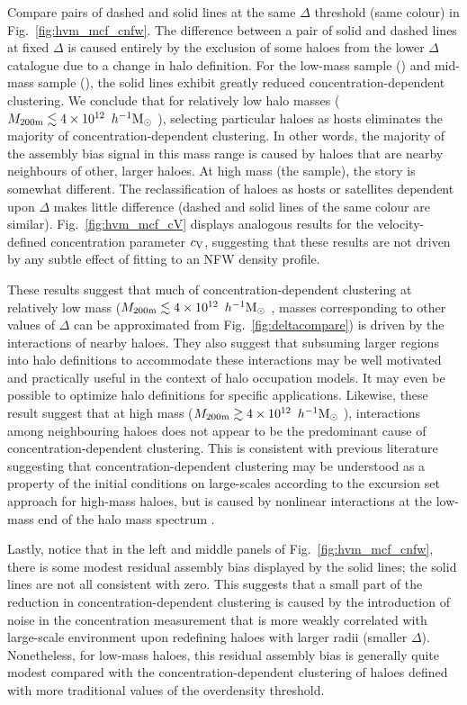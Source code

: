 \documentclass[usenatbib,fleqn]{mnras}
\begin{document}
Compare pairs of dashed and solid lines at the same $\Delta$ threshold (same colour) in Fig.~\ref{fig:hvm_mcf_cnfw}. The difference between a pair of solid and dashed lines at fixed $\Delta$ is caused entirely by the exclusion of some haloes from the lower $\Delta$ catalogue due to a change in halo definition. For the low-mass sample (\simA) and mid-mass sample (\simB), the solid lines exhibit greatly reduced concentration-dependent clustering. We conclude that for relatively low halo masses ($M_{200{\rm m}} \lesssim 4 \times 10^{12}\, \ h^{-1}\mathrm{M}_{\odot}~$), selecting particular haloes as hosts eliminates the majority of concentration-dependent clustering. In other words, the majority of the assembly bias signal in this mass range is caused by haloes that are nearby neighbours of other, larger haloes. At high mass (the \simC{} sample), the story is somewhat different. The reclassification of haloes as hosts or satellites dependent upon $\Delta$ makes little difference (dashed and solid lines of the same colour are similar). Fig.~\ref{fig:hvm_mcf_cV} displays analogous results for the velocity-defined concentration parameter $c_{\rm V}$, suggesting that these results are not driven by any subtle effect of fitting to an NFW density profile. 

These results suggest that much of concentration-dependent clustering at relatively low mass ($M_{200{\rm m}} \lesssim 4 \times 10^{12}\, \ h^{-1}\mathrm{M}_{\odot}~$, masses corresponding to other values of $\Delta$ can be approximated from Fig.~\ref{fig:deltacompare}) is driven by the interactions of nearby haloes. They also suggest that subsuming larger regions into halo definitions to accommodate these interactions may be well motivated and practically useful in the context of halo occupation models. It may even be possible to optimize halo definitions for specific applications. Likewise, these result suggest that at high mass ($M_{200{\rm m}} \gtrsim 4 \times 10^{12}\, \ h^{-1}\mathrm{M}_{\odot}~$), interactions among neighbouring haloes does not appear to be the predominant cause of concentration-dependent clustering. This is consistent with previous literature suggesting that concentration-dependent clustering may be understood as a property of the initial conditions on large-scales according to the excursion set approach \citep{zentner07,dalal_etal08} for high-mass haloes, but is caused by nonlinear interactions at the low-mass end of the halo mass spectrum \citep[e.g.,][]{wang_etal08,warnick_etal08,dalal_etal08,hahn_etal09,ludlow_etal09,lacerna_padilla11}.

Lastly, notice that in the left and middle panels of Fig.~\ref{fig:hvm_mcf_cnfw}, there is some modest residual assembly bias displayed by the solid lines; the solid lines are not all consistent with zero. This suggests that a small part of the reduction in concentration-dependent clustering is caused by the introduction of noise in the concentration measurement that is more weakly correlated with large-scale environment upon redefining haloes with larger radii (smaller $\Delta$). Nonetheless, for low-mass haloes, this residual assembly bias is generally quite modest compared with the concentration-dependent clustering of haloes defined with more traditional values of the overdensity threshold.
\end{document}
